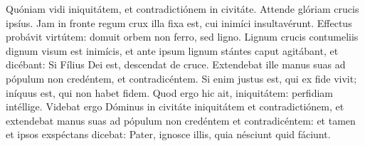 
Quóniam vidi iniquitátem, et contradictiónem in civitáte. Attende glóriam crucis ipsíus. Jam in fronte regum crux illa fixa est, cui inimíci insultavérunt. Effectus probávit virtútem: domuit orbem non ferro, sed ligno. Lignum crucis contumeliis dignum visum est inimícis, et ante ipsum lignum stántes caput agitábant, et dicébant: Si Fílius Dei est, descendat de cruce. Extendebat ille manus suas ad pópulum non credéntem, et contradicéntem. Si enim justus est, qui ex fide vivit; iníquus est, qui non habet fidem. Quod ergo hic ait, iniquitátem: perfidiam intéllige. Videbat ergo Dóminus in civitáte iniquitátem et contradictiónem, et extendebat manus suas ad pópulum non credéntem et contradicéntem: et tamen et ipsos exspéctans dicebat: Pater, ignosce illis, quia nésciunt quid fáciunt.
\par